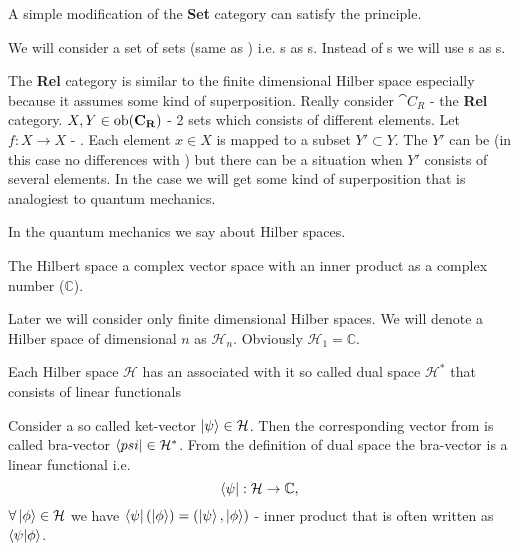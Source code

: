 A simple modification of the \textbf{Set} category can satisfy the
principle. 
\begin{example}
  \label{ex:relcategory}
  We will consider a set of sets (same as )
  i.e. s as s. Instead of
  s we will use s as
  s. 

  The \textbf{Rel} category is similar to the finite dimensional
  Hilber space especially because it assumes some kind of superposition.
  Really consider $\cat{C_R}$ - the \textbf{Rel} category. $X, Y \in
  \mathrm{ob}(\mathbf{C_R})$ - 2 sets which consists of different elements. Let $f: X
  \to X$ - . Each element $x \in X$ is
  mapped to a subset $Y' \subset Y$. The $Y'$ can be
    (in this case no differences with
  ) but there can be a situation when $Y'$
  consists of several elements. In the case we will get some kind of
  superposition that is analogiest to quantum mechanics.
\end{example}

In the quantum mechanics we say about Hilber spaces.
\begin{definition}
  \label{def:hilbert_space} The Hilbert space a complex vector space
  with an inner product as a complex number ($\mathbb{C}$).

  Later we will consider only finite dimensional Hilber spaces.
  We will denote a Hilber space of dimensional $n$ as
  $\mathcal{H}_n$. Obviously $\mathcal{H}_1 = \mathbb{C}$.
\end{definition}

\begin{definition}
\label{def:dual_space}
Each Hilber space $\mathcal{H}$ has an associated with it so called
dual space $\mathcal{H}^\ast$ that consists of linear functionals 
\end{definition}

\begin{example}
\label{ex:dirac_notation}
Consider a so called ket-vector $\ket{\psi} \in \mathcal{H}$. Then the
corresponding vector from  is called
bra-vector $\bra{psi} \in \mathcal{H}^\ast$. From the definition of
dual space the bra-vector is a linear functional i.e. 
\[
\bra{\psi} : \mathcal{H} \to \mathbb{C},
\]
$\forall \ket{\phi} \in \mathcal{H}$ we have 
\(
\bra{\psi}\left(\ket{\phi}\right) = \left(\ket{\psi}, \ket{\phi}\right)
\) - inner product that is often written as $\bra{\psi}\ket{\phi}$.
\end{example}


